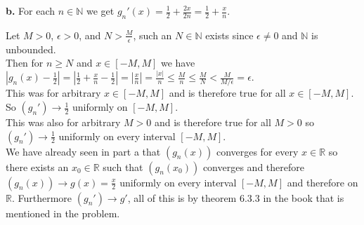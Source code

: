 \documentclass{article}
\begin{document}
{\Large\textbf{b.}} For each $n\in\mathbb{N}$ we get $g_n '(x) =\frac{1}{2} +\frac{2x}{2n} =\frac{1}{2} +\frac{x}{n}$.
\begin{center}
    \doublespacing
    Let $M > 0$, $\epsilon > 0$, and $N >\frac{M}{\epsilon}$, such an $N\in\mathbb{N}$ exists since $\epsilon\neq 0$ and $\mathbb{N}$ is unbounded.
    \\Then for $n\geq N$ and $x\in [-M, M]$ we have $|g_n (x) -\frac{1}{2}| = |\frac{1}{2} +\frac{x}{n} -\frac{1}{2}| = |\frac{x}{n}| =\frac{|x|}{n}\leq\frac{M}{n}\leq\frac{M}{N} <\frac{M}{M /\epsilon} =\epsilon$.
    \\This was for arbitrary $x\in [-M, M]$ and is therefore true for all $x\in [-M, M]$. So $(g_n ')\rightarrow\frac{1}{2}$ uniformly on $[-M, M]$.
    \\This was also for arbitrary $M > 0$ and is therefore true for all $M > 0$ so $(g_n ')\rightarrow\frac{1}{2}$ uniformly on every interval $[-M, M]$.
    \\We have already seen in part a that $(g_n (x))$ converges for every $x\in\mathbb{R}$ so there exists an $x_0\in\mathbb{R}$ such that $(g_n (x_0))$ converges and therefore $(g_n (x))\rightarrow g(x) =\frac{x}{2}$ uniformly on every interval $[-M, M]$ and therefore on $\mathbb{R}$. Furthermore $(g_n ')\rightarrow g'$, all of this is by theorem 6.3.3 in the book that is mentioned in the problem.
\end{center}
\end{document}
